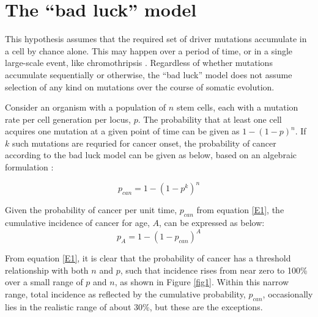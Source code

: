 \documentclass[9pt,onecolumn,twoside]{pnas-new}
\begin{document}
\section*{The ``bad luck'' model}

This hypothesis assumes that the required set of driver mutations accumulate in a cell by chance alone. This may happen over a period of time, or in a single large-scale event, like chromothripsis \cite{Stephens2011}. Regardless of whether mutations accumulate sequentially or otherwise, the ``bad luck'' model does not assume selection of any kind on mutations over the course of somatic evolution.

Consider an organism with a population of $n$ stem cells, each with a mutation rate per cell generation per locus, $p$. The probability that at least one cell acquires one mutation at a given point of time can be given as $1-(1-p)^{n}$. If $k$ such mutations are requried for cancer onset, the probability of cancer according to the bad luck model can be given as below, based on an algebraic formulation \cite{Calabrese2010}:

\begin{equation}
	\label{E1}
	p_{can} = 1-(1-p^{k})^{n}
\end{equation}

Given the probability of cancer per unit time, $p_{can}$ from equation \ref{E1}, the cumulative incidence of cancer for age, $A$, can be expressed as below:
\begin{equation}
	\label{E2}
	p_{A} = 1-(1-p_{can})^{A}
\end{equation}

From equation \ref{E1}, it is clear that the probability of cancer has a threshold relationship with both $n$ and $p$, such that incidence rises from near zero to 100\% over a small range of $p$ and $n$, as shown in Figure \ref{fig1}. Within this narrow range, total incidence as reflected by the cumulative probability, $p_{can}$, occasionally lies in the realistic range of about 30\%, but these are the exceptions.
\end{document}
